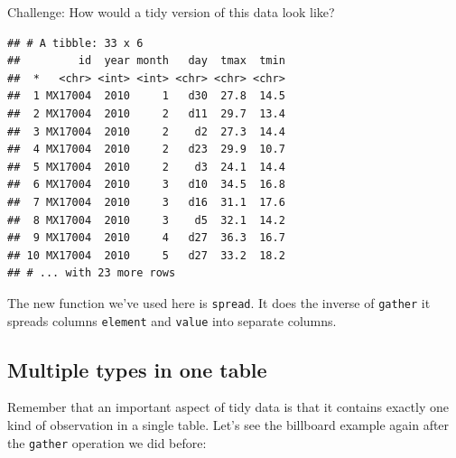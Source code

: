 \documentclass[]{book}
\newenvironment{Shaded}{\begin{snugshade}}{\end{snugshade}}
\newcommand{\KeywordTok}[1]{\textcolor[rgb]{0.13,0.29,0.53}{\textbf{#1}}}
\newcommand{\DataTypeTok}[1]{\textcolor[rgb]{0.13,0.29,0.53}{#1}}
\newcommand{\StringTok}[1]{\textcolor[rgb]{0.31,0.60,0.02}{#1}}
\newcommand{\OtherTok}[1]{\textcolor[rgb]{0.56,0.35,0.01}{#1}}
\newcommand{\OperatorTok}[1]{\textcolor[rgb]{0.81,0.36,0.00}{\textbf{#1}}}
\newcommand{\NormalTok}[1]{#1}
\theoremstyle{definition}
\theoremstyle{definition}
\theoremstyle{remark}
\begin{document}
Challenge: How would a tidy version of this data look like?

\begin{Shaded}
\end{Shaded}

\begin{verbatim}
## # A tibble: 33 x 6
##         id  year month   day  tmax  tmin
##  *   <chr> <int> <int> <chr> <chr> <chr>
##  1 MX17004  2010     1   d30  27.8  14.5
##  2 MX17004  2010     2   d11  29.7  13.4
##  3 MX17004  2010     2    d2  27.3  14.4
##  4 MX17004  2010     2   d23  29.9  10.7
##  5 MX17004  2010     2    d3  24.1  14.4
##  6 MX17004  2010     3   d10  34.5  16.8
##  7 MX17004  2010     3   d16  31.1  17.6
##  8 MX17004  2010     3    d5  32.1  14.2
##  9 MX17004  2010     4   d27  36.3  16.7
## 10 MX17004  2010     5   d27  33.2  18.2
## # ... with 23 more rows
\end{verbatim}

The new function we've used here is \texttt{spread}. It does the inverse
of \texttt{gather} it spreads columns \texttt{element} and
\texttt{value} into separate columns.

\subsection{Multiple types in one
table}\label{multiple-types-in-one-table}

Remember that an important aspect of tidy data is that it contains
exactly one kind of observation in a single table. Let's see the
billboard example again after the \texttt{gather} operation we did
before:

\begin{Shaded}
\end{Shaded}
\end{document}
